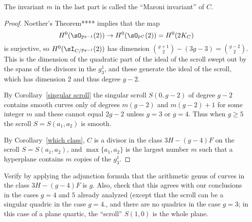
The invariant $m$ in the last part is called the ``Maroni invariant'' of $C$.

\begin{proof}
Noether's Theorem****  implies that the map
$$
H^0(\sO_{\PP^{g-1}}(2)) \to H^0(\sO_{\PP^{C}}(2)) = H^0(2K_C)
$$
is surjective, so $H^0(\sI_{C/\PP^{g-1}}(2))$ has dimension ${g+1} - (3g-3) = {g-2}$. This is the dimension of the quadratic part
of the ideal of the scroll swept out by the spans of the divisors in the $g^1_3$, and these generate the ideal of the scroll, which has dimension 2 and thus
degree $g-2$.

By Corollary~\ref{singular scroll} the singular scroll $S(0,g-2)$ of degree $g-2$ contains smooth curves only of degrees $m(g-2)$ and $m(g-2)+1$ for
some integer $m$ and these
cannot equal $2g-2$ unless $g= 3$ or $g=4$. Thus when $g$ the scroll $S = S(a_1,a_2)$ is  smooth.

By Corollary~\ref{which class}, $C$ is a divisor in the class $3H-(g-4)F$ on the scroll $S = S(a_1,a_2)$, and $\max\{a_1, a_2\}$ is the largest
number $m$ such that a hyperplane contains $m$ copies of the $g^1_3$. 
\end{proof}

\begin{exercise}
Verify by applying the adjunction formula that the arithmetic genus of curves in the class $3H-(g-4)F$ is $g$. Also, check that this agrees with our conclusions in the cases $g = 4$ and $5$ already analyzed (except that the scroll can be a singular quadric in the case $g=4$., and there are no
quadrics in the case $g=3$; in this case of a plane quartic, the ``scroll'' $S(1,0)$ is the whole plane.
\end{exercise}

